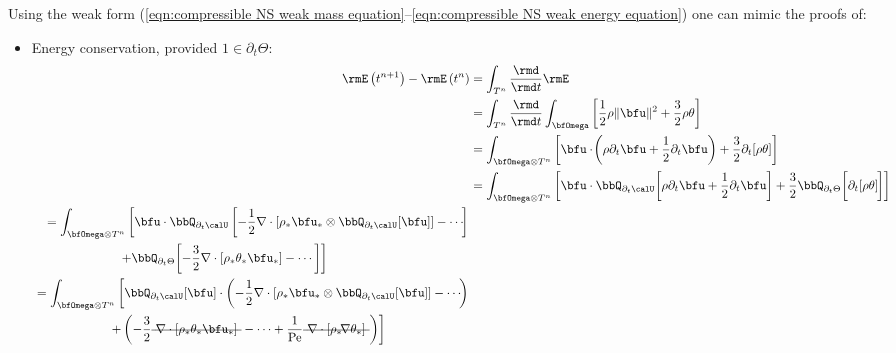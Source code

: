     Using the weak form (\ref{eqn:compressible NS weak mass equation}--\ref{eqn:compressible NS weak energy equation}) one can mimic the proofs of:
    \begin{itemize}
        \item  Energy conservation, provided $1 \in \partial_{t}\Theta$: 
        \begin{align}
                \rmE\left(t^{n + 1}\right) - \rmE\left(t^{n}\right)  &=  \int_{T^{n}}\frac{\rmd}{\rmd t}\rmE  \\
                &=  \int_{T^{n}}\frac{\rmd}{\rmd t}\int_{\bfOmega}\left[\frac{1}{2}\rho\|\bfu\|^{2} + \frac{3}{2}\rho\theta\right]  \\
                &=  \int_{\bfOmega\otimes T^{n}}\left[\bfu\cdot\!\left(\rho\partial_{t}\bfu + \frac{1}{2}\partial_{t}\bfu\right) + \frac{3}{2}\partial_{t}[\rho\theta]\right]  \\
                &=  \int_{\bfOmega\otimes T^{n}}\left[\bfu\cdot\bbQ_{\partial_{t}\calU}\!\left[\rho\partial_{t}\bfu + \frac{1}{2}\partial_{t}\bfu\right] + \frac{3}{2}\bbQ_{\partial_{t}\Theta}\!\left[\partial_{t}[\rho\theta]\tall\!\right]\right]  \\
            \begin{split}
                &=  \int_{\bfOmega\otimes T^{n}}\left[\bfu\cdot\bbQ_{\partial_{t}\calU}\left[- \frac{1}{2}\nabla\cdot\left[\rho_{*}\bfu_{*}\otimes\bbQ_{\partial_{t}\calU}[\bfu]\right] - \cdots\!\right]\right.  \\
                &\qquad\qquad\qquad\left.+ \bbQ_{\partial_{t}\Theta}\!\left[- \frac{3}{2}\nabla\cdot\left[\rho_{*}\theta_{*}\bfu_{*}\right] - \cdots\right]\right]
            \end{split}  \\
            \begin{split}
                &=  \int_{\bfOmega\otimes T^{n}}\left[\bbQ_{\partial_{t}\calU}[\bfu]\cdot\left(- \frac{1}{2}\nabla\cdot\left[\rho_{*}\bfu_{*}\otimes\bbQ_{\partial_{t}\calU}[\bfu]\right] - \cdots\!\right)\right.  \\
                &\qquad\qquad\qquad\left.+ \left(- \frac{3}{2}\mst{\nabla\cdot\left[\rho_{*}\theta_{*}\bfu_{*}\right]} - \cdots + \frac{1}{\rmPe}\mst{\nabla\cdot[\rho_{*}\!\nabla\theta_{*}]}\right)\right]
            \end{split}  \\
            \begin{split}

\end{split}
\end{align}
\end{itemize}
